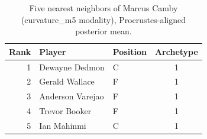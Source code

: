 \begin{table}[htbp]
  \centering\small
  \begin{tabular}{rllc}
    \toprule
    Rank & Player & Position & Archetype \\
    \midrule
    1 & Dewayne Dedmon & C & 1 \\
    2 & Gerald Wallace & F & 1 \\
    3 & Anderson Varejao & F & 1 \\
    4 & Trevor Booker & F & 1 \\
    5 & Ian Mahinmi & C & 1 \\
    \bottomrule
  \end{tabular}
  \caption{Five nearest neighbors of Marcus Camby (curvature_m5 modality), Procrustes-aligned posterior mean.}
  \label{tab:Marcus_Camby_neighbors_curvature_m5}
\end{table}

